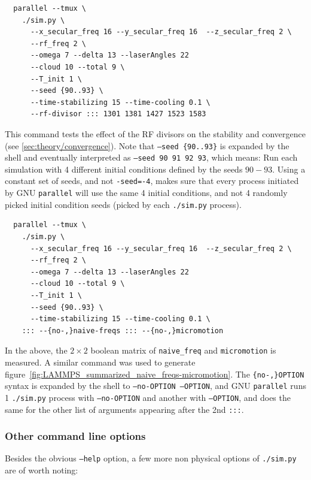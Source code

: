 \begin{verbatim}
  parallel --tmux \
    ./sim.py \
      --x_secular_freq 16 --y_secular_freq 16  --z_secular_freq 2 \
      --rf_freq 2 \
      --omega 7 --delta 13 --laserAngles 22 
      --cloud 10 --total 9 \
      --T_init 1 \
      --seed {90..93} \
      --time-stabilizing 15 --time-cooling 0.1 \
      --rf-divisor ::: 1301 1381 1427 1523 1583
\end{verbatim}

This command tests the effect of the RF divisors on the stability and convergence (see \ref{sec:theory/convergence}). Note that \texttt{--seed \{90..93\}} is expanded by the shell and eventually interpreted as \texttt{--seed 90 91 92 93}, which means: Run each simulation with 4 different initial conditions defined by the seeds $90-93$. Using a constant set of seeds, and not \texttt{-seed=-4}, makes sure that every process initiated by GNU \texttt{parallel} will use the same 4 initial conditions, and not 4 randomly picked initial condition seeds (picked by each \texttt{./sim.py} process).

\begin{verbatim}
  parallel --tmux \
    ./sim.py \
      --x_secular_freq 16 --y_secular_freq 16  --z_secular_freq 2 \
      --rf_freq 2 \
      --omega 7 --delta 13 --laserAngles 22 
      --cloud 10 --total 9 \
      --T_init 1 \
      --seed {90..93} \
      --time-stabilizing 15 --time-cooling 0.1 \
    ::: --{no-,}naive-freqs ::: --{no-,}micromotion
\end{verbatim}

In the above, the $2\times 2$ boolean matrix of \texttt{naive\_freq} and \texttt{micromotion} is measured. A similar command was used to generate figure~\ref{fig:LAMMPS_summarized_naive_freqs-micromotion}. The \texttt{\{no-,\}OPTION} syntax is expanded by the shell to \texttt{--no-OPTION --OPTION}, and GNU \texttt{parallel} runs 1 \texttt{./sim.py} process with \texttt{--no-OPTION} and another with \texttt{--OPTION}, and does the same for the other list of arguments appearing after the 2nd \texttt{:::}.

\subsubsection{Other command line options}

Besides the obvious \texttt{--help} option, a few more non physical options of \texttt{./sim.py} are of worth noting:

